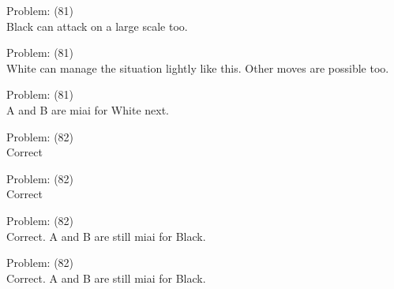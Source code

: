 \documentclass[11pt]{article}
\begin{document}
\begin{minipage}[t]{0.5\textwidth}
  {\centering
  
Problem: (81)\\
Black can attack on a large scale too.\\
  }
\end{minipage}
\begin{minipage}[t]{0.5\textwidth}
  {\centering
  
Problem: (81)\\
White can manage the situation lightly like this. Other moves are possible too.\\
  }
\end{minipage}
\begin{minipage}[t]{0.5\textwidth}
  {\centering
  
Problem: (81)\\
A and B are miai for White next.\\
  }
\end{minipage}
\begin{minipage}[t]{0.5\textwidth}
  {\centering
  
Problem: (82)\\
Correct\\
  }
\end{minipage}
\begin{minipage}[t]{0.5\textwidth}
  {\centering
  
Problem: (82)\\
Correct\\
  }
\end{minipage}
\begin{minipage}[t]{0.5\textwidth}
  {\centering
  
Problem: (82)\\
Correct. A and B are still miai for Black.\\
  }
\end{minipage}
\begin{minipage}[t]{0.5\textwidth}
  {\centering
  
Problem: (82)\\
Correct. A and B are still miai for Black.\\
  }
\end{minipage}
\end{document}
